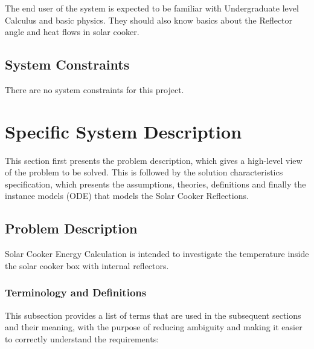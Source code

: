 \documentclass[12pt]{article}
\begin{document}
The end user of the system is expected to be familiar with Undergraduate level Calculus and basic physics. They should also know basics about the Reflector angle and heat flows in solar cooker.  

\subsection{System Constraints}

There are no system constraints for this project.

\section{Specific System Description}

This section first presents the problem description, which gives a high-level
view of the problem to be solved.  This is followed by the solution characteristics
specification, which presents the assumptions, theories, definitions and finally
the instance models (ODE) that models the Solar Cooker Reflections.

\subsection{Problem Description} \label{Sec_pd}

Solar Cooker Energy Calculation is intended to investigate the temperature inside the solar cooker box with internal reflectors. 

\subsubsection{Terminology and  Definitions}

This subsection provides a list of terms that are used in the subsequent
sections and their meaning, with the purpose of reducing ambiguity and making it
easier to correctly understand the requirements:
\end{document}
